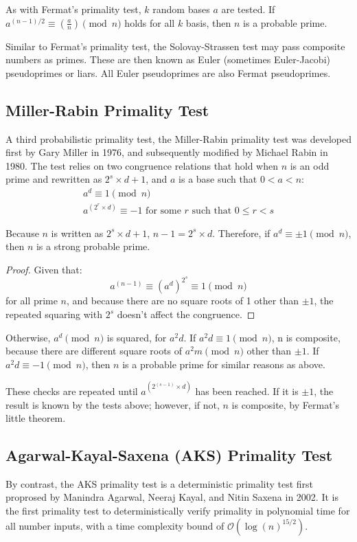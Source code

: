 \documentclass{article}
\begin{document}
As with Fermat's primality test, $k$ random bases $a$ are tested. If $a^{(n - 1) / 2} \equiv (\frac{a}{n}) \pmod{n}$ holds for all $k$ basis, then $n$ is a probable prime.

Similar to Fermat's primality test, the Solovay-Strassen test may pass composite numbers as primes. These are then known as Euler (sometimes Euler-Jacobi) pseudoprimes or liars. All Euler pseudoprimes are also Fermat pseudoprimes. 

\subsection{Miller-Rabin Primality Test} %
A third probabilistic primality test, the Miller-Rabin primality test was developed first by Gary Miller in 1976, and subsequently modified by Michael Rabin in 1980. The test relies on two congruence relations that hold when $n$ is an odd prime and rewritten as $2^s \times d + 1$, and $a$ is a base such that $0 < a < n$:
\begin{gather*}
    a^d \equiv 1 \pmod{n} \\
    a^{(2^r \times d)} \equiv -1 \text{ for some $r$ such that $0 \leq r < s$}
\end{gather*}

Because $n$ is written as $2^s \times d + 1$, $n - 1 = 2^s \times d$. Therefore, if $a^d \equiv \pm 1 \pmod{n}$, then $n$ is a strong probable prime.

\begin{proof}
    Given that:
    \[
        a^{(n - 1)} \equiv (a^d)^{2^s} \equiv 1 \pmod{n}
    \]
    for all prime $n$, and because there are no square roots of 1 other than $\pm 1$, the repeated squaring with $2^s$ doesn't affect the congruence.
\end{proof}

Otherwise, $a^d \pmod{n}$ is squared, for $a^2d$. If $a^2d \equiv 1 \pmod{n}$, n is composite, because there are different square roots of $a^2m \pmod{n}$ other than $\pm 1$. If $a^2d \equiv -1 \pmod{n}$, then $n$ is a probable prime for similar reasons as above.

These checks are repeated until $a^{(2^{(s - 1)} \times d)}$ has been reached. If it is $\pm 1$, the result is known by the tests above; however, if not, $n$ is composite, by Fermat's little theorem.

\subsection{Agarwal-Kayal-Saxena (AKS) Primality Test} %
\label{theory:aks}
By contrast, the AKS primality test is a deterministic primality test first proprosed by Manindra Agarwal, Neeraj Kayal, and Nitin Saxena in 2002. It is the first primality test to deterministically verify primality in polynomial time for all number inputs, with a time complexity bound of $\mathcal{O}(\log{(n)}^{15/2})$.
\end{document}
